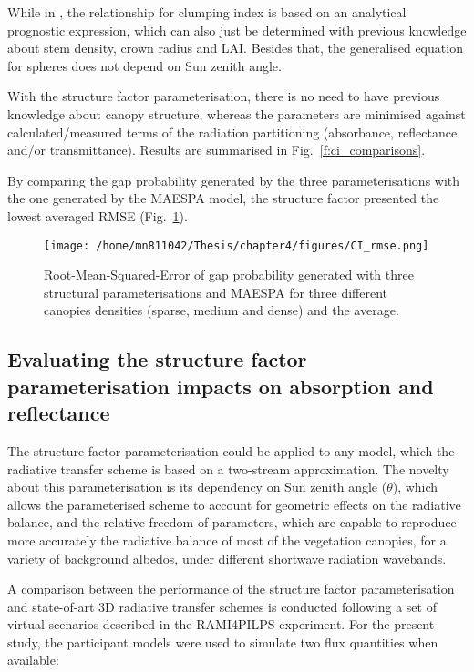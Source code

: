 While in \citet{Ni-Meister2010}, the relationship for clumping index is based on an analytical prognostic expression, which can also just be determined with previous knowledge about stem density, crown radius and LAI. Besides that, the generalised equation for spheres does not depend on Sun zenith angle.

With the structure factor parameterisation, there is no need to have previous knowledge about canopy structure, whereas the parameters are minimised against calculated/measured terms of the radiation partitioning (absorbance, reflectance and/or transmittance). Results are summarised in Fig.~\ref{f:ci_comparisons}.

By comparing the gap probability generated by the three parameterisations with the one generated by the MAESPA model, the structure factor presented the lowest averaged RMSE (Fig.~\ref{fig:ci_rmse}).

\begin{figure}
\centering
\texttt{[image: /home/mn811042/Thesis/chapter4/figures/CI\_rmse.png]}
\caption{Root-Mean-Squared-Error of gap probability generated with three structural parameterisations and MAESPA for three different canopies densities (sparse, medium and dense) and the average.} 
\label{fig:ci_rmse}
\end{figure}

\subsection{Evaluating the structure factor parameterisation impacts on absorption and reflectance}
The structure factor parameterisation could be applied to any model, which the radiative transfer scheme is based on a two-stream approximation. The novelty about this parameterisation is its dependency on Sun zenith angle ($\theta$), which allows the parameterised scheme to account for geometric effects on the radiative balance, and the relative freedom of parameters, which are capable to reproduce more accurately the radiative balance of most of the vegetation canopies, for a variety of background albedos, under different shortwave radiation wavebands. 

A comparison between the performance of the structure factor parameterisation and state-of-art 3D radiative transfer schemes is conducted following a set of virtual scenarios described in the RAMI4PILPS experiment. For the present study, the participant models were used to simulate two flux quantities when available: 

